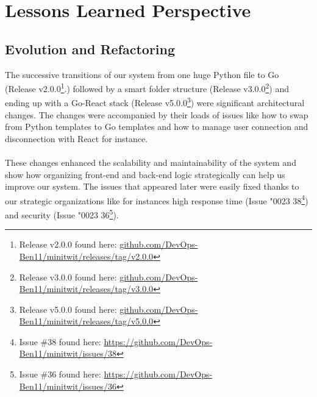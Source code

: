 \section{Lessons Learned Perspective}
\subsection{Evolution and Refactoring}
The successive transitions of our system from one huge Python file to Go (Release v2.0.0\footnote{Release v2.0.0 found here: 
\href{https://github.com/DevOps-Ben11/minitwit/releases/tag/v2.0.0}{github.com/DevOps-Ben11/minitwit/releases/tag/v2.0.0}}.) followed by a smart folder structure (Release v3.0.0\footnote{Release v3.0.0 found here: 
\href{https://github.com/DevOps-Ben11/minitwit/releases/tag/v3.0.0}{github.com/DevOps-Ben11/minitwit/releases/tag/v3.0.0}}) and ending up with a Go-React stack (Release v5.0.0\footnote{Release v5.0.0 found here:
\href{https://github.com/DevOps-Ben11/minitwit/releases/tag/v5.0.0}{github.com/DevOps-Ben11/minitwit/releases/tag/v5.0.0}}) were significant architectural changes. The changes were accompanied by their loads of issues like how to swap from Python templates to Go templates and how to manage user connection and disconnection with React for instance. 
\\
\\
These changes enhanced the scalability and maintainability of the system and show how organizing front-end and back-end logic strategically can help us improve our system. The issues that appeared later were easily fixed thanks to our strategic organizations like for instances high response time (Issue \char"0023 38\footnote{Issue \#38 found here: 
\url{https://github.com/DevOps-Ben11/minitwit/issues/38}}) and security (Issue \char"0023 36\footnote{Issue \#36 found here:
\url{https://github.com/DevOps-Ben11/minitwit/issues/36}}).


